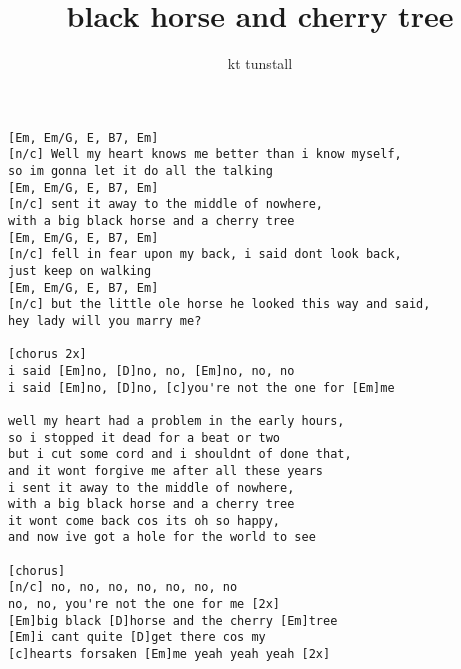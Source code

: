 \author{kt tunstall}
\title{black horse and cherry tree}
\maketitle
\begin{verbatim}
[Em, Em/G, E, B7, Em]
[n/c] Well my heart knows me better than i know myself,
so im gonna let it do all the talking
[Em, Em/G, E, B7, Em]
[n/c] sent it away to the middle of nowhere,
with a big black horse and a cherry tree
[Em, Em/G, E, B7, Em]
[n/c] fell in fear upon my back, i said dont look back,
just keep on walking
[Em, Em/G, E, B7, Em]
[n/c] but the little ole horse he looked this way and said,
hey lady will you marry me?

[chorus 2x]
i said [Em]no, [D]no, no, [Em]no, no, no
i said [Em]no, [D]no, [c]you're not the one for [Em]me

well my heart had a problem in the early hours,
so i stopped it dead for a beat or two
but i cut some cord and i shouldnt of done that,
and it wont forgive me after all these years
i sent it away to the middle of nowhere,
with a big black horse and a cherry tree
it wont come back cos its oh so happy,
and now ive got a hole for the world to see

[chorus]
[n/c] no, no, no, no, no, no, no
no, no, you're not the one for me [2x]
[Em]big black [D]horse and the cherry [Em]tree
[Em]i cant quite [D]get there cos my
[c]hearts forsaken [Em]me yeah yeah yeah [2x]
\end{verbatim}